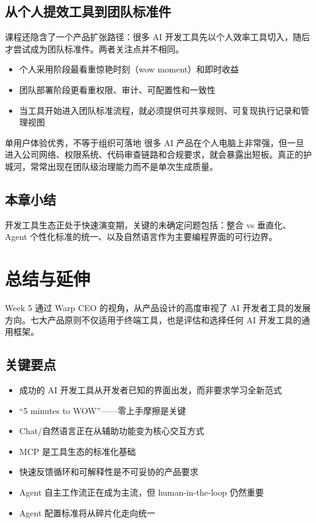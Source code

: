 \documentclass[a4paper]{article}
\begin{document}
\subsection{从个人提效工具到团队标准件}

课程还隐含了一个产品扩张路径：很多 AI 开发工具先以个人效率工具切入，随后才尝试成为团队标准件。两者关注点并不相同。

\begin{itemize}
    \item 个人采用阶段最看重惊艳时刻（wow moment）和即时收益
    \item 团队部署阶段更看重权限、审计、可配置性和一致性
    \item 当工具开始进入团队标准流程，就必须提供可共享规则、可复现执行记录和管理视图
\end{itemize}

\begin{warningbox}{单用户体验优秀，不等于组织可落地}
很多 AI 产品在个人电脑上非常强，但一旦进入公司网络、权限系统、代码审查链路和合规要求，就会暴露出短板。真正的护城河，常常出现在团队级治理能力而不是单次生成质量。
\end{warningbox}

\subsection{本章小结}

开发工具生态正处于快速演变期，关键的未确定问题包括：整合 vs 垂直化、Agent 个性化标准的统一、以及自然语言作为主要编程界面的可行边界。

\section{总结与延伸}

Week 5 通过 Warp CEO 的视角，从产品设计的高度审视了 AI 开发者工具的发展方向。七大产品原则不仅适用于终端工具，也是评估和选择任何 AI 开发工具的通用框架。

\subsection{关键要点}

\begin{itemize}
    \item 成功的 AI 开发工具从开发者已知的界面出发，而非要求学习全新范式
    \item ``5 minutes to WOW''——零上手摩擦是关键
    \item Chat/自然语言正在从辅助功能变为核心交互方式
    \item MCP 是工具生态的标准化基础
    \item 快速反馈循环和可解释性是不可妥协的产品要求
    \item Agent 自主工作流正在成为主流，但 human-in-the-loop 仍然重要
    \item Agent 配置标准将从碎片化走向统一
\end{itemize}
\end{document}

